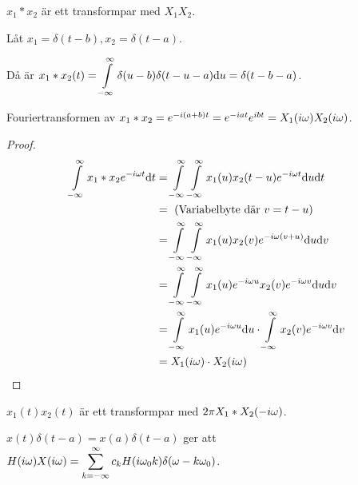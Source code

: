 \documentclass[a4paper]{article}
\begin{document}
\begin{påst}
    \(
        x_1 * x_2 
    \) är ett transformpar med \(
        X_1X_2
    \).

    \begin{ex}
        Låt \(
            x_1 = \delta(t-b), x_2 = \delta(t-a)
        \). 
        
        Då är \(
            x_1*x_2(t) = \displaystyle\int\limits_{-\infty}^{\infty} \delta(u-b) \delta(t-u-a) \dd u
            = \delta(t-b-a)
        \).

        Fouriertransformen av \(
            x_1*x_2 = e^{-i(a+b)t} = e^{-iat} e^{ibt} = X_1(i\omega) X_2(i\omega)
        \).
    \end{ex}

    \begin{proof}
        \begin{align*}
            \displaystyle\int\limits_{-\infty}^{\infty} x_1*x_2 e^{-i\omega t} \dd t 
            &= \displaystyle\int\limits_{-\infty}^{\infty} \displaystyle\int\limits_{-\infty}^{\infty} x_1(u) x_2(t-u) e^{-i\omega t} \dd u \dd t\\
            &= \text{ (Variabelbyte där } v = t-u \text{) } \\
            &= \displaystyle\int\limits_{-\infty}^{\infty} \displaystyle\int\limits_{-\infty}^{\infty} x_1(u) x_2(v) e^{-i\omega(v+u)} \dd u \dd v\\
            &= \displaystyle\int\limits_{-\infty}^{\infty} \displaystyle\int\limits_{-\infty}^{\infty} x_1(u) e^{-i\omega u} x_2(v) e^{-i\omega v} \dd u \dd v\\
            &= \displaystyle\int\limits_{-\infty}^{\infty} x_1(u) e^{-i\omega u} \dd u \cdot \displaystyle\int\limits_{-\infty}^{\infty} x_2(v) e^{-i\omega v} \dd v\\
            &= X_1(i\omega) \cdot X_2(i\omega)
        \end{align*}
    \end{proof}
\end{påst}

\begin{påst}
    \(
        x_1(t)x_2(t) 
    \) är ett transformpar med \(
        2\pi X_1*X_2(-i\omega)
    \). 
\end{påst}

\(
    x(t)\delta(t-a) = x(a)\delta(t-a)
\) ger att \(
    H(i\omega) X(i\omega) = \displaystyle\sum_{k=-\infty}^\infty c_k H(i\omega_0 k) \delta(\omega - k\omega_0)
\).
\end{document}
